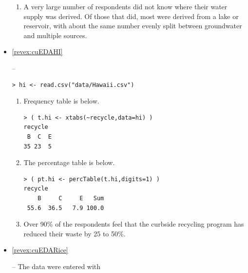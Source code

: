 \documentclass[10pt,openany]{book}\usepackage[]{graphicx}\usepackage[]{color}
\makeatletter
\newenvironment{kframe}{%
 \def\at@end@of@kframe{}%
 \ifinner\ifhmode%
  \def\at@end@of@kframe{\end{minipage}}%
  \begin{minipage}{\columnwidth}%
 \fi\fi%
 \def\FrameCommand##1{\hskip\@totalleftmargin \hskip-\fboxsep
 \colorbox{shadecolor}{##1}\hskip-\fboxsep
     \hskip-\linewidth \hskip-\@totalleftmargin \hskip\columnwidth}%
 \MakeFramed {\advance\hsize-\width
   \@totalleftmargin\z@ \linewidth\hsize
   \@setminipage}}%
 {\par\unskip\endMakeFramed%
 \at@end@of@kframe}
\newenvironment{knitrout}{}{} %
\makeatother
\begin{document}
\begin{itemize}
\begin{enumerate}
    \item A very large number of respondents did not know where their water supply was derived.  Of those that did, most were derived from a lake or reservoir, with about the same number evenly split between groundwater and multiple sources.
  \end{enumerate}

  \item \hypertarget{ans:cuEDAHI}{\ref{revex:cuEDAHI}} --

\begin{knitrout}
\color{fgcolor}\begin{kframe}
\begin{verbatim}
> hi <- read.csv("data/Hawaii.csv")
\end{verbatim}
\end{kframe}
\end{knitrout}
  \begin{enumerate}
    \item Frequency table is below.
\begin{knitrout}
\color{fgcolor}\begin{kframe}
\begin{verbatim}
> ( t.hi <- xtabs(~recycle,data=hi) )
recycle
 B  C  E 
35 23  5 
\end{verbatim}
\end{kframe}
\end{knitrout}
    \item The percentage table is below.
\begin{knitrout}
\color{fgcolor}\begin{kframe}
\begin{verbatim}
> ( pt.hi <- percTable(t.hi,digits=1) )
recycle
    B     C     E   Sum 
 55.6  36.5   7.9 100.0 
\end{verbatim}
\end{kframe}
\end{knitrout}
    \item Over 90\% of the respondents feel that the curbside recycling program has reduced their waste by 25 to 50\%.
  \end{enumerate}

  \item \hypertarget{ans:cuEDARice}{\ref{revex:cuEDARice}} -- The data were entered with


\end{itemize}
\end{document}
